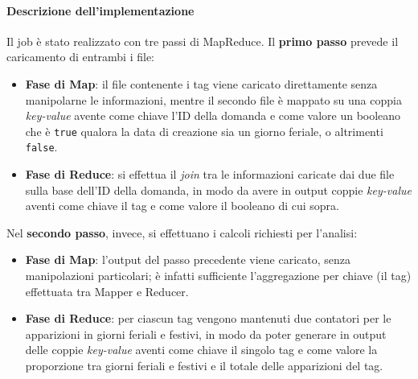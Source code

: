   \paragraph{Descrizione dell'implementazione}\label{par:job1:mapreduce:implementation}

  Il job è stato realizzato con tre passi di MapReduce.
  Il \textbf{primo passo} prevede il caricamento di entrambi i file:
  \begin{itemize}
    \item
      \textbf{Fase di Map}:
      il file contenente i tag viene caricato direttamente senza manipolarne le informazioni,
      mentre il secondo file è mappato su una coppia \textit{key-value} avente come chiave l'ID della domanda
      e come valore un booleano che è \texttt{true} qualora la data di creazione sia un giorno feriale, o altrimenti \texttt{false}.

    \item
      \textbf{Fase di Reduce}:
      si effettua il \textit{join} tra le informazioni caricate dai due file sulla base dell'ID della domanda,
      in modo da avere in output coppie \textit{key-value} aventi come chiave il tag e come valore il booleano di cui sopra.
  \end{itemize}

  Nel \textbf{secondo passo}, invece, si effettuano i calcoli richiesti per l'analisi:
  \begin{itemize}
    \item
      \textbf{Fase di Map}:
      l'output del passo precedente viene caricato, senza manipolazioni particolari;
      è infatti sufficiente l'aggregazione per chiave (il tag) effettuata tra Mapper e Reducer.

    \item
      \textbf{Fase di Reduce}:
      per ciascun tag vengono mantenuti due contatori per le apparizioni in giorni feriali e festivi,
      in modo da poter generare in output delle coppie \textit{key-value} aventi come chiave il singolo tag e come valore la proporzione tra giorni feriali e festivi e il totale delle apparizioni del tag.
  \end{itemize}

